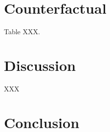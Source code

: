 \documentclass[10pt]{article}
\begin{document}
\section{Counterfactual}

Table XXX.

\section{Discussion}

XXX


\section{Conclusion}



\end{document}
